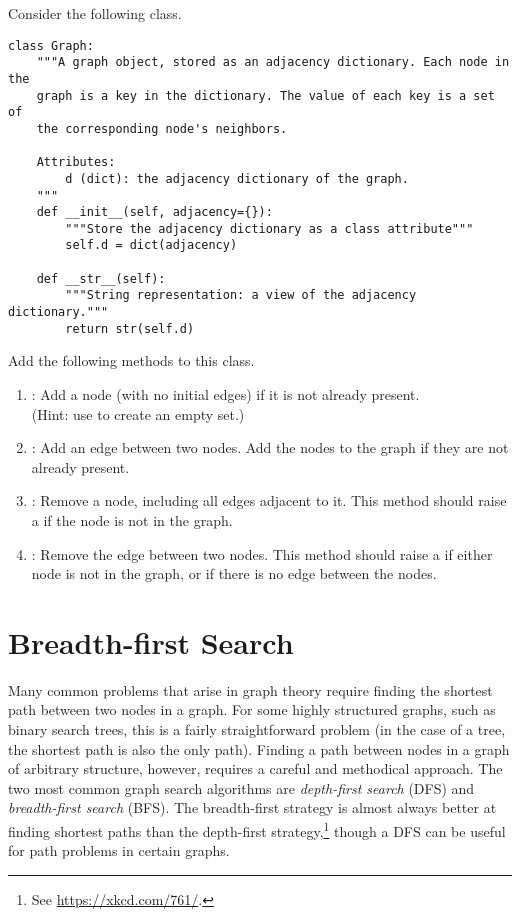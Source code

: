 \begin{problem} %
\label{prob:bfs-graph-warmup}
Consider the following  class.
\begin{lstlisting}
class Graph:
    """A graph object, stored as an adjacency dictionary. Each node in the
    graph is a key in the dictionary. The value of each key is a set of
    the corresponding node's neighbors.

    Attributes:
        d (dict): the adjacency dictionary of the graph.
    """
    def __init__(self, adjacency={}):
        """Store the adjacency dictionary as a class attribute"""
        self.d = dict(adjacency)

    def __str__(self):
        """String representation: a view of the adjacency dictionary."""
        return str(self.d)
\end{lstlisting}
Add the following methods to this class.
\begin{enumerate}
\item {}: Add a node (with no initial edges) if it is not already present.
\\ (Hint: use  to create an empty set.)
\item {}: Add an edge between two nodes. Add the nodes to the graph if they are not already present.
\item {}: Remove a node, including all edges adjacent to it.
This method should raise a  if the node is not in the graph.
\item {}: Remove the edge between two nodes.
This method should raise a  if either node is not in the graph, or if there is no edge between the nodes.
\end{enumerate}
\end{problem}

\section*{Breadth-first Search} %

Many common problems that arise in graph theory require finding the shortest path between two nodes in a graph.
For some highly structured graphs, such as binary search trees, this is a fairly straightforward problem (in the case of a tree, the shortest path is also the only path).
Finding a path between nodes in a graph of arbitrary structure, however, requires a careful and methodical approach.
The two most common graph search algorithms are \emph{depth-first search} (DFS) and \emph{breadth-first search} (BFS).
The breadth-first strategy is almost always better at finding shortest paths than the depth-first strategy,\footnote{See \url{https://xkcd.com/761/}.} though a DFS can be useful for path problems in certain graphs.


